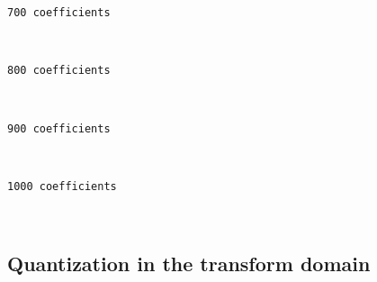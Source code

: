     \begin{Verbatim}[commandchars=\\\{\}]
700 coefficients
    \end{Verbatim}

    \begin{center}
    \end{center}
    { \hspace*{\fill} \\}
    
    \begin{Verbatim}[commandchars=\\\{\}]
800 coefficients
    \end{Verbatim}

    \begin{center}
    \end{center}
    { \hspace*{\fill} \\}
    
    \begin{Verbatim}[commandchars=\\\{\}]
900 coefficients
    \end{Verbatim}

    \begin{center}
    \end{center}
    { \hspace*{\fill} \\}
    
    \begin{Verbatim}[commandchars=\\\{\}]
1000 coefficients
    \end{Verbatim}

    \begin{center}
    \end{center}
    { \hspace*{\fill} \\}
    
    \hypertarget{quantization-in-the-transform-domain}{%
\subsection{Quantization in the transform
domain}\label{quantization-in-the-transform-domain}}

